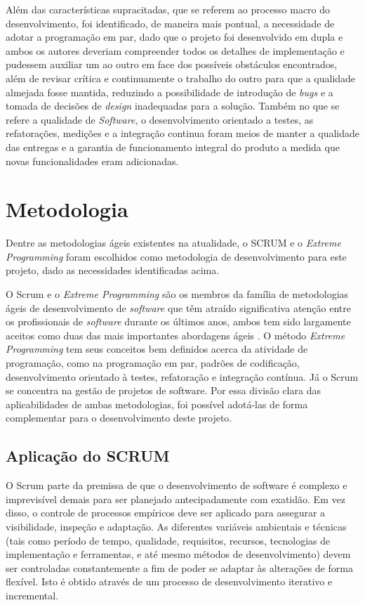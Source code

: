 Além das características supracitadas, que se referem ao processo macro do desenvolvimento, foi identificado, de maneira mais pontual, a necessidade de adotar a programação em par, dado que o projeto foi desenvolvido em dupla e ambos os autores deveriam compreender todos os detalhes de implementação e pudessem auxiliar um ao outro em face dos possíveis obstáculos encontrados, além de revisar crítica e continuamente o trabalho do outro para que a qualidade almejada fosse mantida, reduzindo a possibilidade de introdução de \textit{bugs} e a tomada de decisões de \textit{design} inadequadas para a solução. Também no que se refere a qualidade de \textit{Software}, o desenvolvimento orientado a testes, as refatorações, medições e a integração continua foram meios de manter a qualidade das entregas e a garantia de funcionamento integral do produto a medida que novas funcionalidades eram adicionadas.

\section{Metodologia}

Dentre as metodologias ágeis existentes na atualidade, o SCRUM e o \textit{Extreme Programming} foram escolhidos como metodologia de desenvolvimento para este projeto, dado as necessidades identificadas acima.

O Scrum e o \textit{Extreme Programming} são os membros da família de metodologias ágeis de desenvolvimento de \textit{software} que têm atraído significativa atenção entre os profissionais de \textit{software} durante os últimos anos, ambos tem sido largamente aceitos como duas das mais importantes abordagens ágeis \cite{book:xp}.
O método \textit{Extreme Programming} tem seus conceitos bem definidos acerca da atividade de programação, como na programação em par, padrões de codificação, desenvolvimento orientado à testes, refatoração e integração contínua. Já o Scrum se concentra na gestão de projetos de software. Por essa divisão clara das aplicabilidades de ambas metodologias, foi possível adotá-las de forma complementar para o desenvolvimento deste projeto.

\subsection{Aplicação do SCRUM}

O Scrum parte da premissa de que o desenvolvimento de software é complexo e imprevisível demais para ser planejado antecipadamente com exatidão. Em vez disso, o controle de processos empíricos deve ser aplicado para assegurar a visibilidade, inspeção e adaptação.
As diferentes variáveis ambientais e técnicas (tais como período de tempo, qualidade, requisitos, recursos, tecnologias de implementação e ferramentas, e até mesmo métodos de desenvolvimento) devem ser controladas constantemente a fim de poder se adaptar às alterações de forma flexível. Isto é obtido através de um processo de desenvolvimento iterativo e incremental.

